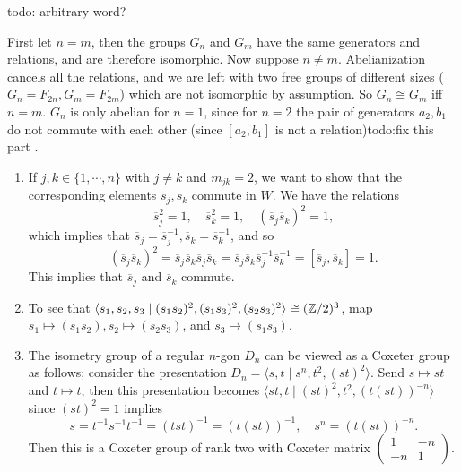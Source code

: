 \begin{ex}
    {\color{red}todo: arbitrary word?} 
\end{ex}
\begin{ex}
    First let $n=m$, then the groups $G_n $ and $G_m$ have the same generators and relations, and are therefore isomorphic. Now suppose $n\neq m$. Abelianization cancels all the relations, and we are left with two free groups of different sizes ($G_n =F _{2n}, G_m = F_{2m}$) which are not isomorphic by assumption. So $G_n  \cong  G_m $ iff $n=m$. $G_n $ is only abelian for $n=1$, since for $n=2$ the pair of generators $a_2,b_1$ do not commute with each other (since $[a_2,b_1]$ is not a relation){\color{red}todo:fix this part} .
\end{ex}
\begin{ex}
    \begin{enumerate}[label=(\arabic*)]
    \setlength\itemsep{-.2em}
\item If $j,k \in \{1,\cdots ,n\} $ with $j\neq k$ and $m_{jk}=2$, we want to show that the corresponding elements $\overline{s}_j ,\overline{s}_k$ commute in $W$. We have the relations \[
        \overline{s}_j ^2=1,\quad \overline{s}_k^2=1,\quad (\overline{s}_j \overline{s}_k)^2=1,
\] which implies that $\overline{s}_j =\overline{s}_j ^{-1}, \overline{s}_k=\overline{s}_k^{-1}$, and so \[
(\overline{s}_j \overline{s}_k)^2=\overline{s}_j \overline{s}_k\overline{s}_j \overline{s}_k=\overline{s}_j \overline{s}_k\overline{s}_j ^{-1}\overline{s}_k^{-1}=[\overline{s}_j ,\overline{s}_k]=1.
\] This implies that $\overline{s}_j $ and $\overline{s}_k$ commute.
\item To see that $\langle s_1,s_2,s_3\mid (s_1s_2)^2,(s_1s_3)^2,(s_2s_3)^2 \rangle \cong (\mathbb{Z} /2)^3$, map $s_1 \mapsto (s_1s_2), s_2 \mapsto (s_2s_3)$, and $s_3 \mapsto (s_1s_3)$.
\item The isometry group of a regular $n$-gon $D_n $ can be viewed as a Coxeter group as follows; consider the presentation $D_n =\langle s,t \mid s^n,t^2, (st)^2 \rangle $. Send $s \mapsto st$ and $t \mapsto t$, then this presentation becomes $\langle st, t \mid (st)^2,t^2, (t(st))^{-n} \rangle $ since $(st)^2=1$ implies 
    \[
        s=t^{-1}s^{-1}t^{-1}=(tst)^{-1}=(t(st))^{-1},\quad s^n =(t(st))^{-n}.
    \] 
    Then this is a Coxeter group of rank two with Coxeter matrix $\left( 
    \begin{smallmatrix}
        1 & -n \\
        -n & 1
    \end{smallmatrix}\right) $.
    \end{enumerate}
\end{ex}
